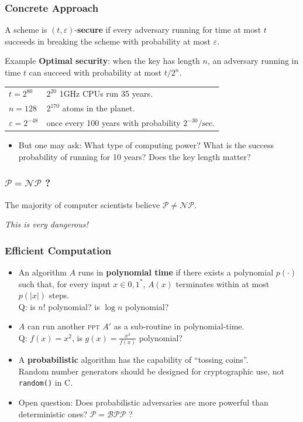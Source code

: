 \begin{frame}\frametitle{Concrete Approach}
A scheme is $(t,\varepsilon)$-\textbf{secure} if every adversary running for time at most $t$ succeeds in breaking the scheme with probability at most $\varepsilon$.
\begin{exampleblock}{Example}
\textbf{Optimal security}: when the key has length $n$, an adversary running in time $t$ can succeed with probability at most $t/2^n$.
\begin{tabular}{ll}
$t=2^{80}$ & $2^{20}$ 1GHz CPUs run 35 years. \\
$n=128$   & $2^{170}$ atoms in the planet. \\
$\varepsilon=2^{-48}$  & once every 100 years with probability $2^{-30}/\text{sec}$. \\
\end{tabular}
\end{exampleblock}
\begin{itemize}
\item But one may ask: What type of computing power? What is the success probability of running for 10 years? Does the key length matter? 
\end{itemize}
\end{frame}
\begin{frame}\frametitle{$\mathcal{P} = \mathcal{NP}$ ?}
\begin{figure}
\begin{center}

\end{center}
\end{figure}
\centerline{The majority of computer scientists believe $\mathcal{P} \ne \mathcal{NP}$.}
\centerline{\alert{\emph{This is very dangerous!}}} 
\end{frame}
\begin{frame}[fragile]\frametitle{Efficient Computation}
\begin{itemize}
\item An algorithm $A$ runs in \textbf{polynomial time} if there exists a polynomial $p(\cdot)$ such that,
 for every input $x \in {0,1}^*$, $A(x)$ terminates within at most $p(|x|)$ steps. \\
 \alert{Q: is $n!$ polynomial? is $\log n$ polynomial?}
\item $A$ can run another \textsc{ppt} $A'$ as a sub-routine in polynomial-time.\\
 \alert{Q: $f(x) = x^{2} $, is $g(x) =  \frac{x^{3}}{f(x)}$ polynomial?}
\item A \textbf{probabilistic} algorithm has the capability of ``tossing coins''.\\
Random number generators should be designed for cryptographic use, not \verb|random()| in C. 
\item \alert{Open question}: Does probabilistic adversaries are more powerful than deterministic ones?  
$\mathcal{P} = \mathcal{BPP}$ ? 
\end{itemize}
\end{frame}
